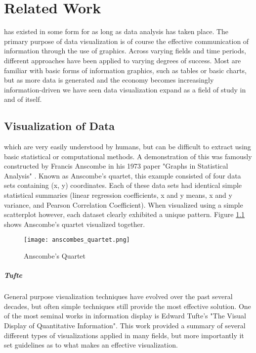 \chapter{Related Work}
\label{sec:state_of_the_art}
 has existed in some form for as long as data analysis has taken place. The primary purpose of data visualization is of course the effective communication of information through the use of graphics. Across varying fields and time periods, different approaches have been applied to varying degrees of success. Most are familiar with basic forms of information graphics, such as tables or basic charts, but as more data is generated and the economy becomes increasingly information-driven we have seen data visualization expand as a field of study in and of itself. 
 
\section{Visualization of Data}
\label{sec:dataviz}
 which are very easily understood by humans, but can be difficult to extract using basic statistical or computational methods. A demonstration of this was famously constructed by Francis Anscombe in his 1973 paper "Graphs in Statistical Analysis" \cite{Anscombe1973}. Known as Anscombe's quartet, this example consisted of four data sets containing (x, y) coordinates. Each of these data sets had identical simple statistical summaries (linear regression coefficients, x and y means, x and y variance, and Pearson Correlation Coefficient). When visualized using a simple scatterplot however, each dataset clearly exhibited a unique pattern. Figure \ref{fig:anscombe} shows Anscombe's quartet visualized together. 

\begin{figure}
	\centering
	\label{fig:anscombe}
	\texttt{[image: anscombes\_quartet.png]}
	\caption{Anscombe's Quartet \cite{Shoresh2012}}
\end{figure}

\paragraph{Tufte}
General purpose visualization techniques have evolved over the past several decades, but often simple techniques still provide the most effective solution. One of the most seminal works in information display is Edward Tufte's "The Visual Display of Quantitative Information"\cite{Tufle1983}. This work provided a summary of several different types of visualizations applied in many fields, but more importantly it set guidelines as to what makes an effective visualization.

